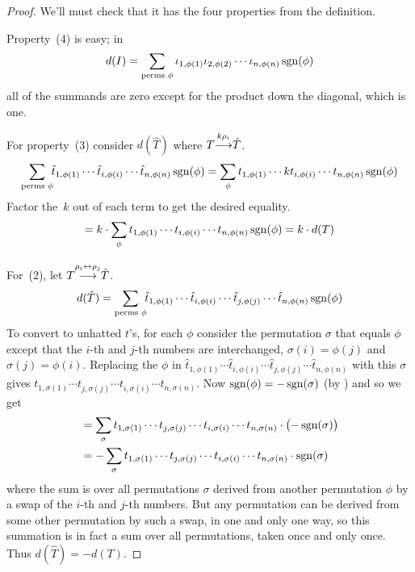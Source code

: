 \begin{proof}
We'll must check that it has the four properties
from the definition.

Property~(4) is easy; in
\begin{equation*}
  d(I)=
  \sum_{\text{perms\ }\phi}
    \iota_{1,\phi(1)}\iota_{2,\phi(2)}\cdots \iota_{n,\phi(n)}
                                 \operatorname{sgn}(\phi)
\end{equation*}
all of the summands are zero except for the product down the diagonal,
which is one.

For property~(3) consider $d(\hat{T})$ where 
\( T\smash[b]{\mathrel{ \mathop{\longrightarrow}\limits^{k\rho_i\mathstrut}_{ \begin{subarray}{l} \relax \end{subarray}}}}\hat{T} \).
\begin{equation*}
  \sum_{\text{perms\ }\phi}\!\!
    \hat{t}_{1,\phi(1)}
     \cdots\hat{t}_{i,\phi(i)}\cdots\hat{t}_{n,\phi(n)}
                                 \operatorname{sgn}(\phi)                      
  =\sum_{\phi}
     t_{1,\phi(1)}\cdots kt_{i,\phi(i)}\cdots t_{n,\phi(n)}
                                 \operatorname{sgn}(\phi)
\end{equation*}
Factor the~\( k \) out of each term to get the desired equality.
\begin{equation*}
  =k\cdot\sum_{\phi}
     t_{1,\phi(1)}\cdots t_{i,\phi(i)}\cdots t_{n,\phi(n)}
                                 \operatorname{sgn}(\phi)                 
  =k\cdot d(T)
\end{equation*}

For~(2), let 
\( T\smash[b]{\mathrel{ \mathop{\longrightarrow}\limits^{\rho_i\leftrightarrow\rho_j\mathstrut}_{ \begin{subarray}{l} \relax \end{subarray}}}}\hat{T} \).
\begin{equation*}
  d(\hat{T})=
  \sum_{\text{perms\ }\phi}\!\!
    \hat{t}_{1,\phi(1)}
    \cdots\hat{t}_{i,\phi(i)}
    \cdots\hat{t}_{j,\phi(j)}
    \cdots \hat{t}_{n,\phi(n)}
                                 \operatorname{sgn}(\phi)
\end{equation*}
To convert to unhatted \( t \)'s, 
for each $\phi$ consider the permutation \( \sigma \) that
equals \( \phi \) except that the
\( i \)-th and \( j \)-th numbers are interchanged,
\( \sigma(i)=\phi(j) \) and \( \sigma(j)=\phi(i) \).
Replacing the \( \phi \) in
\( \hat{t}_{1,\phi(1)}
    \cdots\hat{t}_{i,\phi(i)}
    \cdots\hat{t}_{j,\phi(j)}
    \cdots \hat{t}_{n,\phi(n)} 
    \)
with this \( \sigma \) gives
 \(    t_{1,\sigma(1)}
       \cdots t_{j,\sigma(j)}
       \cdots t_{i,\sigma(i)}
       \cdots t_{n,\sigma(n)} 
       \).
Now \( \operatorname{sgn}(\phi)=-\operatorname{sgn}(\sigma) \)
(by )
and so we get
\begin{align*}
  &=\sum_\sigma
     t_{1,\sigma(1)}
    \cdots t_{j,\sigma(j)}
    \cdots t_{i,\sigma(i)}
    \cdots t_{n,\sigma(n)}
                                 \cdot\bigl(-\operatorname{sgn}(\sigma)\bigr)        \\
  &=-\sum_{\sigma}
     t_{1,\sigma(1)}\cdots t_{j,\sigma(j)}
    \cdots t_{i,\sigma(i)}\cdots t_{n,\sigma(n)}\cdot\operatorname{sgn}(\sigma)
\end{align*}
where the sum is over all permutations \( \sigma \) derived from
another permutation \( \phi \) by a swap of the \( i \)-th and
\( j \)-th numbers.
But any permutation can be derived from some other permutation by such a swap,
in one and only one way,
so this summation is in fact a sum over all permutations,
taken once and only once.
Thus \( d(\hat{T})=-d(T) \).


\end{proof}
